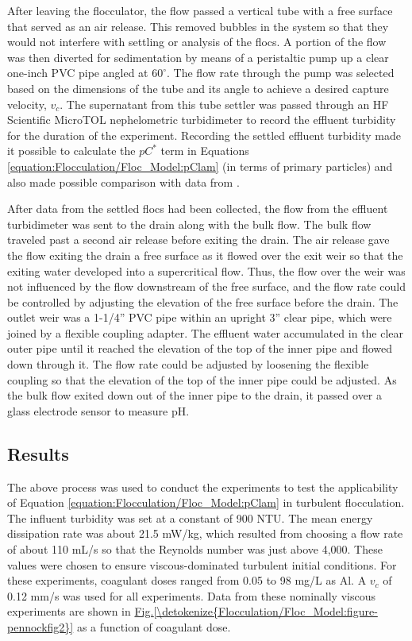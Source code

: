 \documentclass[letterpaper,10pt,english]{sphinxmanual}
\begin{document}
After leaving the flocculator, the flow passed a vertical tube with a free surface that served as an air release. This removed bubbles in the system so that they would not interfere with settling or analysis of the flocs. A portion of the flow was then diverted for sedimentation by means of a peristaltic pump up a clear one-inch PVC pipe angled at \(60^{\circ}\). The flow rate through the pump was selected based on the dimensions of the tube and its angle to achieve a desired capture velocity, \(v_c\). The supernatant from this tube settler was passed through an HF Scientific MicroTOL nephelometric turbidimeter to record the effluent turbidity for the duration of the experiment. Recording the settled effluent turbidity made it possible to calculate the \(pC^*\) term in Equations \eqref{equation:Flocculation/Floc_Model:pClam} (in terms of primary particles) and also made possible comparison with data from \label{\detokenize{Flocculation/Floc_Model:id14}}{\hyperref[\detokenize{Flocculation/Floc_Model:floc-model-swetland-flocculation-sedimentation-2014}]{\sphinxcrossref{{[}SWSL14{]}}}}.

After data from the settled flocs had been collected, the flow from the effluent turbidimeter was sent to the drain along with the bulk flow. The bulk flow traveled past a second air release before exiting the drain. The air release gave the flow exiting the drain a free surface as it flowed over the exit weir so that the exiting water developed into a supercritical flow. Thus, the flow over the weir was not influenced by the flow downstream of the free surface, and the flow rate could be controlled by adjusting the elevation of the free surface before the drain. The outlet weir was a 1-1/4” PVC pipe within an upright 3” clear pipe, which were joined by a flexible coupling adapter. The effluent water accumulated in the clear outer pipe until it reached the elevation of the top of the inner pipe and flowed down through it. The flow rate could be adjusted by loosening the flexible coupling so that the elevation of the top of the inner pipe could be adjusted. As the bulk flow exited down out of the inner pipe to the drain, it passed over a glass electrode sensor to
measure pH.


\subsection{Results}
\label{\detokenize{Flocculation/Floc_Model:results}}
The above process was used to conduct the experiments to test the applicability of Equation \eqref{equation:Flocculation/Floc_Model:pClam} in turbulent flocculation. The influent turbidity was set at a constant of 900 NTU. The mean energy dissipation rate was about 21.5 mW/kg, which resulted from choosing a flow rate of about 110 mL/s so that the Reynolds number was just above 4,000. These values were chosen to ensure viscous-dominated turbulent initial conditions. For these experiments, coagulant doses ranged from 0.05 to 98 mg/L as Al. A \(v_c\) of 0.12 mm/s was used for all experiments. Data from these nominally viscous experiments are shown in \hyperref[\detokenize{Flocculation/Floc_Model:figure-pennockfig2}]{Fig.\@ \ref{\detokenize{Flocculation/Floc_Model:figure-pennockfig2}}} as a function of coagulant dose.
\end{document}
